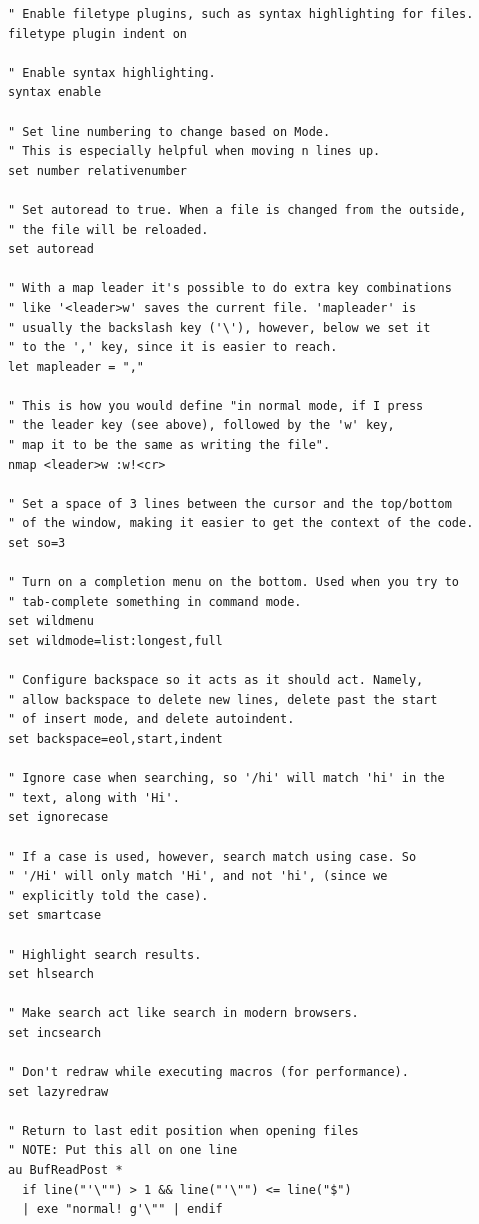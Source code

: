 \documentclass[11pt]{article}
\begin{document}
\begin{verbatim}
" Enable filetype plugins, such as syntax highlighting for files. 
filetype plugin indent on

" Enable syntax highlighting. 
syntax enable

" Set line numbering to change based on Mode.
" This is especially helpful when moving n lines up.
set number relativenumber

" Set autoread to true. When a file is changed from the outside, 
" the file will be reloaded. 
set autoread

" With a map leader it's possible to do extra key combinations 
" like '<leader>w' saves the current file. 'mapleader' is 
" usually the backslash key ('\'), however, below we set it 
" to the ',' key, since it is easier to reach.
let mapleader = ","

" This is how you would define "in normal mode, if I press 
" the leader key (see above), followed by the 'w' key, 
" map it to be the same as writing the file".
nmap <leader>w :w!<cr>

" Set a space of 3 lines between the cursor and the top/bottom 
" of the window, making it easier to get the context of the code. 
set so=3

" Turn on a completion menu on the bottom. Used when you try to 
" tab-complete something in command mode. 
set wildmenu
set wildmode=list:longest,full

" Configure backspace so it acts as it should act. Namely, 
" allow backspace to delete new lines, delete past the start 
" of insert mode, and delete autoindent.
set backspace=eol,start,indent

" Ignore case when searching, so '/hi' will match 'hi' in the 
" text, along with 'Hi'. 
set ignorecase

" If a case is used, however, search match using case. So 
" '/Hi' will only match 'Hi', and not 'hi', (since we 
" explicitly told the case). 
set smartcase

" Highlight search results. 
set hlsearch

" Make search act like search in modern browsers. 
set incsearch

" Don't redraw while executing macros (for performance). 
set lazyredraw

" Return to last edit position when opening files 
" NOTE: Put this all on one line 
au BufReadPost * 
  if line("'\"") > 1 && line("'\"") <= line("$") 
  | exe "normal! g'\"" | endif
\end{verbatim}
\end{document}
